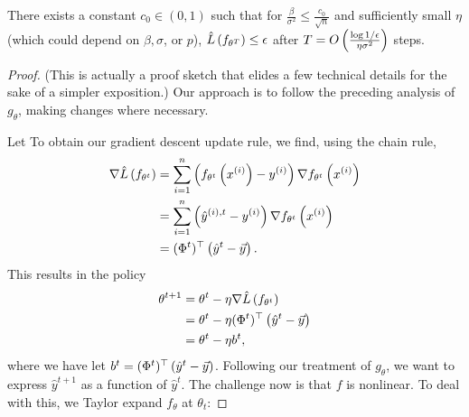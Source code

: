 \begin{theorem}
There exists a constant $c_0 \in (0, 1)$ such that for $\frac{\beta}{\sigma^2} \leq \frac{c_0}{\sqrt{n}}$ and sufficiently small $\eta$ (which could depend on $\beta, \sigma$, or $p$), $\hat{L}\left(f_{\theta^T}\right) \leq \epsilon$ after $T = O \left(\frac{\log 1/\epsilon}{\eta\sigma^2}\right)$ steps. \label{lec14:thm:optimization_f} 
\end{theorem}

\begin{proof}

(This is actually a proof sketch that elides a few technical details for the sake of a simpler exposition.) Our approach is to follow the preceding analysis of $g_\theta$, making changes where necessary.

Let  
To obtain our gradient descent update rule, we find, using the chain rule,
\begin{align}
    \nabla \hat{L}\left(f_{\theta^t}\right) &=  \sum_{i=1}^n\left(f_{\theta^t}\left(x^{(i)}\right) - y^{(i)}\right)\nabla f_{\theta^t}\left(x^{(i)}\right) \\ 
    &=  \sum_{i=1}^n\left(\hat{y}^{(i), t} - y^{(i)}\right)\nabla f_{\theta^t}\left(x^{(i)}\right) \\
    &= (\Phi^t)^\top\left(\hat{y}^t - \vec{y}\right).
\end{align}
This results in the policy
\begin{align}
    \theta^{t+1} &= \theta^t - \eta \nabla \hat{L}\left(f_{\theta^t}\right) \\
    &= \theta^t - \eta (\Phi^t)^\top\left(\hat{y}^t - \vec{y}\right) \\ 
    &= \theta^t - \eta b^t,
\end{align}
where we have let $b^t = (\Phi^t)^\top\left(\hat{y}^t - \vec{y}\right)$. Following our treatment of $g_\theta$, we want to express $\hat{y}^{t+1}$ as a function of $\hat{y}^{t}$. The challenge now is that $f$ is nonlinear. To deal with this, we Taylor expand $f_\theta$ at $\theta_t$:


\end{proof}
